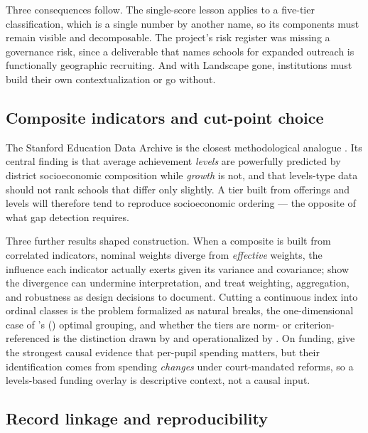 \documentclass[12pt]{article}
\begin{document}
Three consequences follow. The single-score lesson applies to a five-tier classification, which is a single number by another name, so its components must remain visible and decomposable. The project's risk register was missing a governance risk, since a deliverable that names schools for expanded outreach is functionally geographic recruiting. And with Landscape gone, institutions must build their own contextualization or go without.

\subsection{Composite indicators and cut-point choice}
\label{sec:measuring-quality}

The Stanford Education Data Archive is the closest methodological analogue \citep{ho2020}. Its central finding \citep{jang2019} is that average achievement \emph{levels} are powerfully predicted by district socioeconomic composition while \emph{growth} is not, and that levels-type data should not rank schools that differ only slightly. A tier built from offerings and levels will therefore tend to reproduce socioeconomic ordering --- the opposite of what gap detection requires.

Three further results shaped construction. When a composite is built from correlated indicators, nominal weights diverge from \emph{effective} weights, the influence each indicator actually exerts given its variance and covariance; \citet{cadre2024} show the divergence can undermine interpretation, and \citet{nardo2008} treat weighting, aggregation, and robustness as design decisions to document. Cutting a continuous index into ordinal classes is the problem \citet{jenks1967} formalized as natural breaks, the one-dimensional case of \citeauthor{fisher1958}'s (\citeyear{fisher1958}) optimal grouping, and whether the tiers are norm- or criterion-referenced is the distinction drawn by \citet{glaser1963} and operationalized by \citet{cizek2007}. On funding, \citet{jackson2016} give the strongest causal evidence that per-pupil spending matters, but their identification comes from spending \emph{changes} under court-mandated reforms, so a levels-based funding overlay is descriptive context, not a causal input.

\subsection{Record linkage and reproducibility}
\label{sec:record-linkage}
\end{document}
